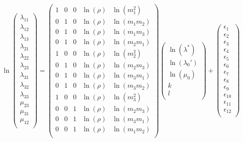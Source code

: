 \documentclass[a4paper,fleqn]{DC_ArtStyle}
\begin{document}
	\begin{equation}
		\ln
		\begin{pmatrix}
		\lambda_{11} \\
		\lambda_{12} \\
		\lambda_{13} \\
		\lambda_{21} \\
		\lambda_{22} \\
		\lambda_{23} \\
		\lambda_{31} \\
		\lambda_{32} \\
		\lambda_{33} \\
		\mu_{23} \\
		\mu_{31} \\
		\mu_{12} \\
		\end{pmatrix} = \begin{pmatrix}
		1 & 0 & 0 & \ln(\rho) & \ln(m_1^2) \\
		0 & 1 & 0 & \ln(\rho) & \ln(m_1 m_2) \\
		0 & 1 & 0 & \ln(\rho) & \ln(m_1 m_3) \\
		0 & 1 & 0 & \ln(\rho) & \ln(m_2 m_1) \\
		1 & 0 & 0 & \ln(\rho) & \ln(m_2^2) \\
		0 & 1 & 0 & \ln(\rho) & \ln(m_2 m_3) \\
		0 & 1 & 0 & \ln(\rho) & \ln(m_3 m_1) \\
		0 & 1 & 0 & \ln(\rho) & \ln(m_3 m_2) \\
		1 & 0 & 0 & \ln(\rho) & \ln(m_3^2) \\
		0 & 0 & 1 & \ln(\rho) & \ln(m_2 m_3) \\
		0 & 0 & 1 & \ln(\rho) & \ln(m_3 m_1) \\
		0 & 0 & 1 & \ln(\rho) & \ln(m_1 m_2) \\
		\end{pmatrix} \begin{pmatrix}
		\ln(\lambda^{*}) \\
		\ln(\lambda_0') \\
		\ln(\mu_0) \\
		k \\
		l \\
		\end{pmatrix} + \begin{pmatrix}
		\epsilon_{1} \\
		\epsilon_{2} \\
		\epsilon_{3} \\
		\epsilon_{4} \\
		\epsilon_{5} \\
		\epsilon_{6} \\
		\epsilon_{7} \\
		\epsilon_{8} \\
		\epsilon_{9} \\
		\epsilon_{10} \\
		\epsilon_{11} \\
		\epsilon_{12} \\
		\end{pmatrix}
		\label{EqFit}
	\end{equation}
\end{document}
